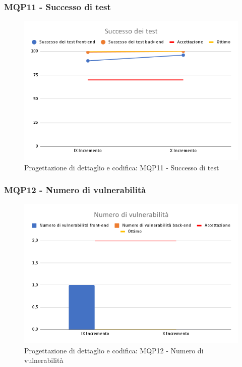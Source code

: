\subsubsection{MQP11 - Successo di test}
\begin{figure}[H]
    \centering
    \includegraphics[scale=0.50]{Sezioni/images/last_prodotto/Successo_dei_test.png}
    \caption{Progettazione di dettaglio e codifica: MQP11 - Successo di test}
\end{figure}
\subsubsection{MQP12 - Numero di vulnerabilità}
\begin{figure}[H]
    \centering
    \includegraphics[scale=0.50]{Sezioni/images/last_prodotto/Numero_di_vulnerabilita.png}
    \caption{Progettazione di dettaglio e codifica: MQP12 - Numero di vulnerabilità}
\end{figure}
